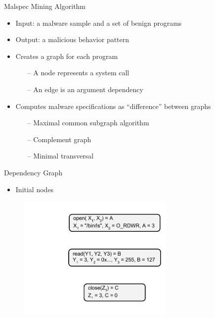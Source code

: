 \documentclass{beamer}
\begin{document}
\begin{frame}{Malspec Mining Algorithm}
  \begin{itemize}
    \item Input: a malware sample and a set of benign programs
    \item Output: a malicious behavior pattern
    \item Creates a graph for each program
    \begin{itemize}
      \item[--] A node represents a system call
      \item[--] An edge is an argument dependency
    \end{itemize}
    \item Computes malware specifications as ``difference'' between graphs
    \begin{itemize}
      \item[--] Maximal common subgraph algorithm
      \item[--] Complement graph
      \item[--] Minimal transversal
    \end{itemize}
  \end{itemize}
\end{frame}

\begin{frame}{Dependency Graph}
  \begin{itemize}
    \item Initial nodes
  \end{itemize}
  \begin{figure}[p]
    \includegraphics[width=3in]{img/syscall-dep-graph-0.pdf}
    \end{figure}
\end{frame}
\end{document}
